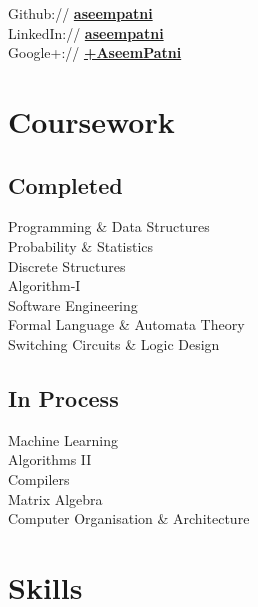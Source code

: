 \documentclass[a4paper]{deedy-resume} %
\begin{document}
\begin{minipage}[t]{0.33\textwidth}
Github:// \href{https://github.com/aseempatni}{\bf aseempatni} \\
LinkedIn:// \href{https://www.linkedin.com/in/Aseem-Patni}{\bf aseempatni} \\
Google+:// \href{https://google.com/+AseemPatni}{\bf +AseemPatni} \\

\sectionspace %



\section{Coursework}

\subsection{Completed}

Programming \& Data Structures \\
Probability \& Statistics \\
Discrete Structures \\
Algorithm-I \\
Software Engineering \\
Formal Language \& Automata Theory \\
Switching Circuits \& Logic Design \\

\sectionspace %


\subsection{In Process}

Machine Learning \\
Algorithms II \\
Compilers \\
Matrix Algebra \\
Computer Organisation \& Architecture \\

\sectionspace %


\section{Skills}


\end{minipage}
\end{document}
